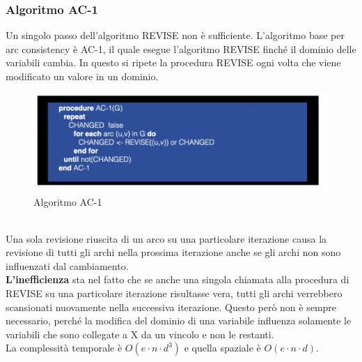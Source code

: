 \subsubsection{Algoritmo AC-1}
Un singolo passo dell'algoritmo REVISE non è sufficiente. L'algoritmo base per
arc consistency è AC-1, il quale esegue l'algoritmo REVISE finché il dominio
delle variabili cambia. In questo si ripete la procedura REVISE ogni volta che
viene modificato un valore in un dominio.
\begin{figure}[htp]
    \centering
    \includegraphics[width=13cm, keepaspectratio]{img/Cap3/ac-1.png}
    \caption{Algoritmo AC-1}
\end{figure}
\\Una sola revisione riuscita di un arco su una particolare iterazione causa la
revisione di tutti gli archi nella prossima iterazione anche se gli archi non
sono influenzati dal cambiamento.\\
\textbf{L'inefficienza} sta nel fatto che se anche una singola chiamata alla
procedura di REVISE su una particolare iterazione risultasse vera, tutti gli
archi verrebbero scansionati nuovamente nella successiva iterazione. Questo però
non è sempre necessario, perché la modifica del dominio di una variabile
influenza solamente le variabili che sono collegate a X da un vincolo e non le
restanti.\\
La complessità temporale è $O(e \cdot n \cdot d^3)$ e quella spaziale è $O(e \cdot n \cdot d)$.

